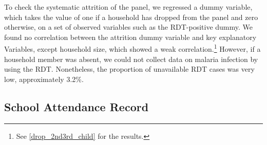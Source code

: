 \documentclass[fleqn,11pt]{article}
\begin{document}
% 

% 

% 

% 

% 

To check the systematic attrition of the panel, we regressed a dummy variable, which takes the value of one if a household has dropped from the panel and zero otherwise, on a set of observed variables such as the RDT-positive dummy. We found no correlation between the attrition dummy variable and key explanatory
Variables, except household size, which showed a weak correlation.\footnote{See \autoref{drop_2nd3rd_child} for the results.} However, if a household member was
absent, we could not collect data on malaria infection by using the RDT. Nonetheless, the proportion of unavailable RDT cases was very low, approximately 3.2\%.

\subsection{School Attendance Record}

\end{document}

